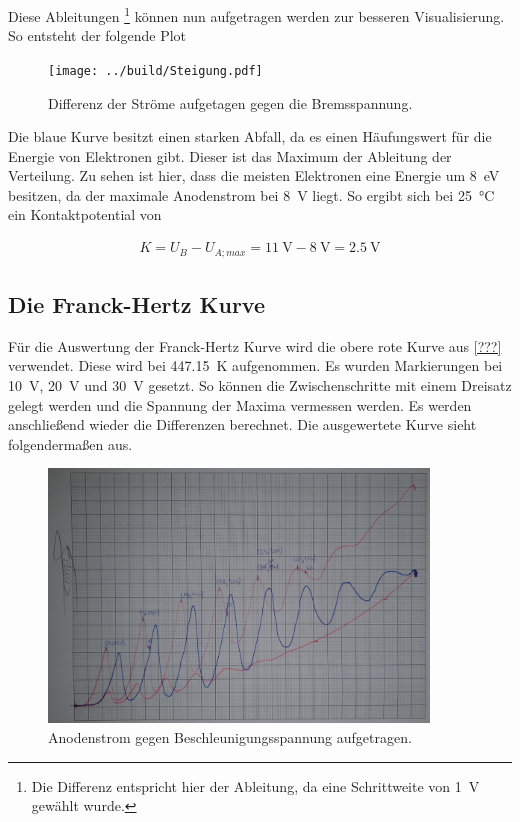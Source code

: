 \noindent Diese Ableitungen \footnote{Die Differenz entspricht hier der Ableitung, da eine Schrittweite von \qty{1}{\volt} gewählt wurde.} 
können nun aufgetragen werden zur besseren Visualisierung. So entsteht der folgende Plot

\begin{figure}[H]
    \centering
    \texttt{[image: ../build/Steigung.pdf]}
    \caption{Differenz der Ströme aufgetagen gegen die Bremsspannung.}
\end{figure}

\noindent Die blaue Kurve besitzt einen starken Abfall, da es einen Häufungswert für die Energie von Elektronen gibt. Dieser 
ist das Maximum der Ableitung der Verteilung.
Zu sehen ist hier, dass die meisten Elektronen eine Energie um \qty{8}{\electronvolt} besitzen, da der maximale Anodenstrom 
bei \qty{8}{\volt} liegt. So ergibt sich 
bei \qty{25}{\celsius} ein Kontaktpotential von 

\begin{align*}
    K=U_B - U_{A; max} = \qty{11}{\volt} - \qty{8}{\volt} = \qty{2.5}{\volt}
\end{align*}


\subsection{Die Franck-Hertz Kurve}
Für die Auswertung der Franck-Hertz Kurve wird die obere rote Kurve aus \ref{???} verwendet. Diese wird bei \qty{447.15}{\kelvin} 
aufgenommen. Es wurden Markierungen bei \qty{10}{\volt}, \qty{20}{\volt} und \qty{30}{\volt} gesetzt. So können die Zwischenschritte 
mit einem Dreisatz gelegt werden und die Spannung der Maxima vermessen werden. Es werden anschließend wieder die Differenzen berechnet. 
Die ausgewertete Kurve sieht folgendermaßen aus.

\begin{figure}[H]
    \centering
    \includegraphics[width=0.9\textwidth]{FranckHertz.jpg}
    \caption{Anodenstrom gegen Beschleunigungsspannung aufgetragen.}
\end{figure}

